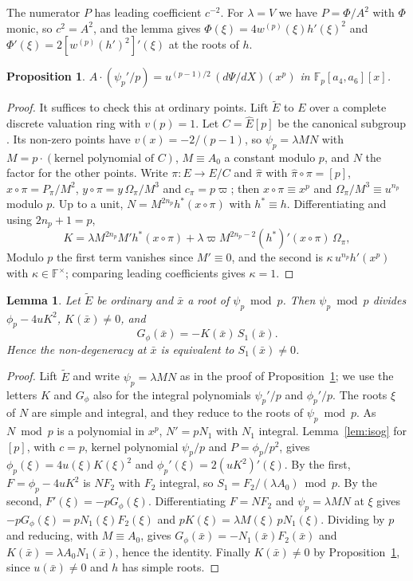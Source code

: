 \documentclass[11pt,a4paper]{amsart}
\newcommand{\F}{\mathbb{F}}
\newcommand{\Fp}{\mathbb{F}_p}
\newcommand{\Et}{\widetilde{E}}
\theoremstyle{plain}
\newtheorem{lemma}[theorem]{Lemma}
\newtheorem{proposition}[theorem]{Proposition}
\theoremstyle{definition}
\theoremstyle{remark}
\begin{document}
The numerator $P$ has leading coefficient $c^{-2}$. For $\lambda=V$ we have $P=\Phi/A^2$ with $\Phi$ monic, so $c^2=A^2$, and the lemma gives $\Phi(\xi)=4w^{(p)}(\xi)h'(\xi)^2$ and $\Phi'(\xi)=2[w^{(p)}(h')^2]'(\xi)$ at the roots of $h$.

\begin{proposition}\label{prop:psi}
$A\cdot(\psi_p'/p)=u^{(p-1)/2}\,(d\Psi/dX)(x^p)$ in $\Fp[a_4,a_6][x]$.
\end{proposition}

\begin{proof}
It suffices to check this at ordinary points. Lift $\Et$ to $E$ over a complete discrete valuation ring with $v(p)=1$. Let $C=\widehat E[p]$ be the canonical subgroup \cite{Kat73}. Its non-zero points have $v(x)=-2/(p-1)$, so $\psi_p=\lambda MN$ with $M=p\cdot(\text{kernel polynomial of }C)$, $M\equiv A_0$ a constant modulo $p$, and $N$ the factor for the other points. Write $\pi\colon E\to E/C$ and $\hat\pi$ with $\hat\pi\circ\pi=[p]$, $x\circ\pi=P_\pi/M^2$, $y\circ\pi=y\,\Omega_\pi/M^3$ and $c_\pi=p\varpi$; then $x\circ\pi\equiv x^p$ and $\Omega_\pi/M^3\equiv u^{n_p}$ modulo $p$. Up to a unit, $N=M^{2n_p}h^*(x\circ\pi)$ with $h^*\equiv h$. Differentiating and using $2n_p+1=p$,
\[
K=\lambda M^{2n_p}M'h^*(x\circ\pi)+\lambda\varpi M^{2n_p-2}(h^*)'(x\circ\pi)\,\Omega_\pi,
\]
Modulo $p$ the first term vanishes since $M'\equiv0$, and the second is $\kappa\,u^{n_p}h'(x^p)$ with $\kappa\in\F^\times$; comparing leading coefficients gives $\kappa=1$.
\end{proof}

\begin{lemma}\label{lem:ND-S1}
Let $\Et$ be ordinary and $\bar x$ a root of $\psi_p\bmod p$. Then $\psi_p\bmod p$ divides $\phi_p-4uK^2$, $K(\bar x)\ne0$, and
\[
G_\phi(\bar x)=-K(\bar x)\,S_1(\bar x).
\]
Hence the non-degeneracy at $\bar x$ is equivalent to $S_1(\bar x)\ne0$.
\end{lemma}

\begin{proof}
Lift $\Et$ and write $\psi_p=\lambda MN$ as in the proof of Proposition~\ref{prop:psi}; we use the letters $K$ and $G_\phi$ also for the integral polynomials $\psi_p'/p$ and $\phi_p'/p$. The roots $\xi$ of $N$ are simple and integral, and they reduce to the roots of $\psi_p\bmod p$. As $N\bmod p$ is a polynomial in $x^p$, $N'=pN_1$ with $N_1$ integral. Lemma~\ref{lem:isog} for $[p]$, with $c=p$, kernel polynomial $\psi_p/p$ and $P=\phi_p/p^2$, gives $\phi_p(\xi)=4u(\xi)K(\xi)^2$ and $\phi_p'(\xi)=2(uK^2)'(\xi)$. By the first, $F=\phi_p-4uK^2$ is $NF_2$ with $F_2$ integral, so $S_1=F_2/(\lambda A_0)\bmod p$. By the second, $F'(\xi)=-pG_\phi(\xi)$. Differentiating $F=NF_2$ and $\psi_p=\lambda MN$ at $\xi$ gives $-pG_\phi(\xi)=pN_1(\xi)F_2(\xi)$ and $pK(\xi)=\lambda M(\xi)\,pN_1(\xi)$. Dividing by $p$ and reducing, with $M\equiv A_0$, gives $G_\phi(\bar x)=-N_1(\bar x)F_2(\bar x)$ and $K(\bar x)=\lambda A_0N_1(\bar x)$, hence the identity. Finally $K(\bar x)\ne0$ by Proposition~\ref{prop:psi}, since $u(\bar x)\ne0$ and $h$ has simple roots.
\end{proof}
\end{document}
